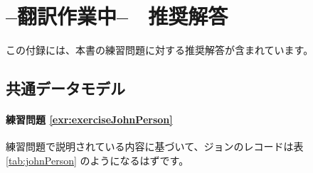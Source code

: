 \documentclass[
  11pt]{book}
\theoremstyle{definition}
\theoremstyle{definition}
\theoremstyle{definition}
\theoremstyle{definition}
\theoremstyle{remark}
\begin{document}
\chapter{--翻訳作業中--　推奨解答}\label{SuggestedAnswers}

この付録には、本書の練習問題に対する推奨解答が含まれています。

\section{共通データモデル}\label{Cdmanswers}

\subsubsection*{練習問題 \ref{exr:exerciseJohnPerson}}\label{ux7df4ux7fd2ux554fux984c-refexrexercisejohnperson}

練習問題で説明されている内容に基づいて、ジョンのレコードは表 \ref{tab:johnPerson} のようになるはずです。
\end{document}

